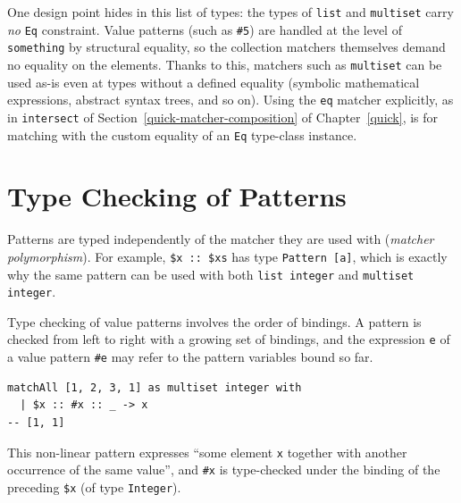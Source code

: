 One design point hides in this list of types: the types of \lstinline{list} and \lstinline{multiset} carry \emph{no} \lstinline{Eq} constraint.
Value patterns (such as \lstinline{#5}) are handled at the level of \lstinline{something} by structural equality, so the collection matchers themselves demand no equality on the elements.
Thanks to this, matchers such as \lstinline{multiset} can be used as-is even at types without a defined equality (symbolic mathematical expressions, abstract syntax trees, and so on).
Using the \lstinline{eq} matcher explicitly, as in \lstinline{intersect} of Section~\ref{quick-matcher-composition} of Chapter~\ref{quick}, is for matching with the custom equality of an \lstinline{Eq} type-class instance.

\section{Type Checking of Patterns}\label{matcher-pattern-typing}

Patterns are typed independently of the matcher they are used with (\emph{matcher polymorphism}).
For example, \lstinline{$x :: $xs} has type \lstinline{Pattern [a]}, which is exactly why the same pattern can be used with both \lstinline{list integer} and \lstinline{multiset integer}.

Type checking of value patterns involves the order of bindings.
A pattern is checked from left to right with a growing set of bindings, and the expression \lstinline{e} of a value pattern \lstinline{#e} may refer to the pattern variables bound so far.
\begin{lstlisting}[language=egison,numbers=none]
matchAll [1, 2, 3, 1] as multiset integer with
  | $x :: #x :: _ -> x
-- [1, 1]
\end{lstlisting}
This non-linear pattern expresses ``some element \lstinline{x} together with another occurrence of the same value'', and \lstinline{#x} is type-checked under the binding of the preceding \lstinline{$x} (of type \lstinline{Integer}).


